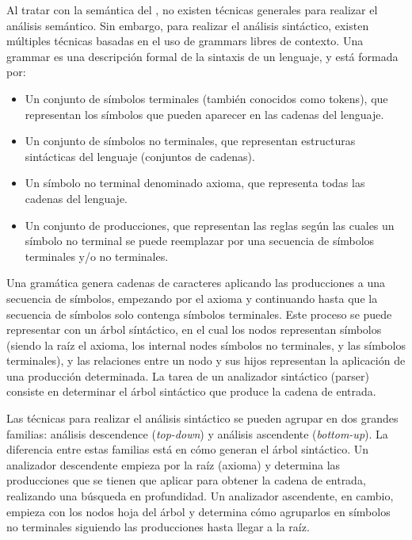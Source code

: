 Al tratar con la semántica del , no
existen técnicas generales para realizar el análisis semántico. Sin embargo,
para realizar el análisis sintáctico, existen múltiples técnicas basadas en el
uso de \glspl{grammar} libres de contexto. Una \gls{grammar} es una descripción
formal de la sintaxis de un lenguaje, y está formada por:
\parencite{dragon-book}

\begin{itemize}
    \item Un conjunto de símbolos terminales (también conocidos como
    \glspl{token}), que representan los símbolos que pueden aparecer en las
    cadenas del lenguaje.
    \item Un conjunto de símbolos no terminales, que representan estructuras
    sintácticas del lenguaje (conjuntos de cadenas).
    \item Un símbolo no terminal denominado axioma, que representa todas las
    cadenas del lenguaje.
    \item Un conjunto de producciones, que representan las reglas según las
    cuales un símbolo no terminal se puede reemplazar por una secuencia de
    símbolos terminales y/o no terminales.
\end{itemize}

Una gramática genera cadenas de caracteres aplicando las producciones a una
secuencia de símbolos, empezando por el axioma y continuando hasta que la
secuencia de símbolos solo contenga símbolos terminales. Este proceso se puede
representar con un árbol síntáctico, en el cual los nodos representan símbolos
(siendo la raíz el axioma, los \glspl{internal node} símbolos no terminales, y
las  símbolos terminales), y las relaciones entre un
nodo y sus hijos representan la aplicación de una producción determinada. La
tarea de un analizador sintáctico (\gls{parser}) consiste en determinar el árbol
sintáctico que produce la cadena de entrada. \parencite{dragon-book}

Las técnicas para realizar el análisis sintáctico se pueden agrupar en dos
grandes familias: análisis descendence (\textit{top-down}) y análisis ascendente
(\textit{bottom-up}). La diferencia entre estas familias está en cómo generan el
árbol sintáctico. Un analizador descendente empieza por la raíz (axioma) y
determina las producciones que se tienen que aplicar para obtener la cadena de
entrada, realizando una búsqueda en profundidad. Un analizador ascendente, en
cambio, empieza con los nodos hoja del árbol y determina cómo agruparlos en
símbolos no terminales siguiendo las producciones hasta llegar a la raíz.
\parencite{dragon-book}

